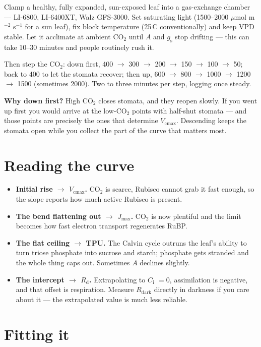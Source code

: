 \documentclass[11pt,letterpaper]{article}
\newcommand{\Vcmax}{\ensuremath{V_{\mathrm{cmax}}}}
\newcommand{\Jmax}{\ensuremath{J_{\mathrm{max}}}}
\newcommand{\Rd}{\ensuremath{R_{\mathrm{d}}}}
\newcommand{\Ci}{\ensuremath{C_{\mathrm{i}}}}
\newcommand{\umol}{\ensuremath{\mu}mol}
\begin{document}
Clamp a healthy, fully expanded, sun-exposed leaf into a gas-exchange chamber
--- LI-6800, LI-6400XT, Walz GFS-3000. Set saturating light (1500--2000 \umol{}
m$^{-2}$ s$^{-1}$ for a sun leaf), fix block temperature (25\,\textdegree C
conventionally) and keep VPD stable. Let it acclimate at ambient CO$_2$ until
$A$ and $g_{\mathrm{s}}$ stop drifting --- this can take 10--30 minutes and
people routinely rush it.

Then step the CO$_2$: down first, 400 $\to$ 300 $\to$ 200 $\to$ 150 $\to$ 100
$\to$ 50; back to 400 to let the stomata recover; then up, 600 $\to$ 800 $\to$
1000 $\to$ 1200 $\to$ 1500 (sometimes 2000). Two to three minutes per step,
logging once steady.

\textbf{Why down first?} High CO$_2$ closes stomata, and they reopen slowly. If
you went up first you would arrive at the low-CO$_2$ points with half-shut
stomata --- and those points are precisely the ones that determine \Vcmax{}.
Descending keeps the stomata open while you collect the part of the curve that
matters most.

\section{Reading the curve}

\begin{itemize}
  \item \textbf{Initial rise $\to$ \Vcmax{}.} CO$_2$ is scarce, Rubisco cannot
        grab it fast enough, so the slope reports how much active Rubisco is
        present.
  \item \textbf{The bend flattening out $\to$ \Jmax{}.} CO$_2$ is now plentiful
        and the limit becomes how fast electron transport regenerates RuBP.
  \item \textbf{The flat ceiling $\to$ TPU.} The Calvin cycle outruns the
        leaf's ability to turn triose phosphate into sucrose and starch;
        phosphate gets stranded and the whole thing caps out. Sometimes $A$
        declines slightly.
  \item \textbf{The intercept $\to$ \Rd{}.} Extrapolating to \Ci{} $=0$,
        assimilation is negative, and that offset is respiration. Measure
        $R_{\mathrm{dark}}$ directly in darkness if you care about it --- the
        extrapolated value is much less reliable.
\end{itemize}

\section{Fitting it}
\end{document}
